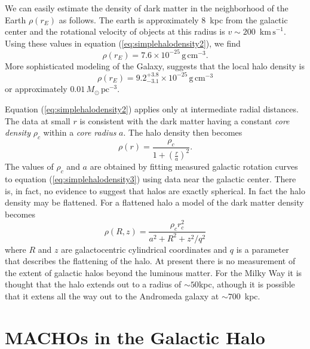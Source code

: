 We can easily estimate the density of dark matter in the neighborhood of the
Earth $\rho(r_E)$ as follows. The earth is approximately $8$~kpc
from the galactic center and the rotational velocity of objects at this radius
is $v\sim 200$~$\mathrm{km\,s}^{-1}$. Using these values in equation
(\ref{eq:simplehalodensity2}), we find
\begin{equation}
\rho(r_E) = 7.6 \times 10^{-25}\, \mathrm{g}\,\mathrm{cm}^{-3}.
\end{equation}
More sophisticated modeling of the
Galaxy\cite{1995ApJ...449L.123G}, suggests that the local halo density is
\begin{equation}
\rho(r_E) = 9.2_{-3.1}^{+3.8} \times 10^{-25}\, \mathrm{g}\,\mathrm{cm}^{-3}
\end{equation}
or approximately $0.01\,M_\odot\,\mathrm{pc}^{-3}$.

Equation (\ref{eq:simplehalodensity2}) applies only at intermediate radial
distances. The data at small $r$ is consistent with the dark matter having a
constant \emph{core density} $\rho_c$ within a \emph{core radius}
$a$\cite{Rix:1996}. The halo density then becomes
\begin{equation}
\rho(r) = \frac{\rho_c}{1 + \left(\frac{r}{a}\right)^2}.
\label{eq:simplehalodensity3}
\end{equation}
The values of $\rho_c$ and $a$ are obtained by fitting measured galactic
rotation curves to equation (\ref{eq:simplehalodensity3}) using data near the
galactic center.  There is, in fact, no evidence to suggest that halos are
exactly spherical. In fact the halo density may be flattened\cite{Rix:1996}. For a
flattened halo a model of the dark matter density becomes
\begin{equation}
\rho(R,z) = \frac{\rho_c r^2_c}{a^2 + R^2 + z^2/q^2}
\label{eq:simplehalodensity4}
\end{equation}
where $R$ and $z$ are galactocentric cylindrical coordinates and $q$ is a
parameter that describes the flattening of the halo. At present there is no
measurement of the extent of galactic halos beyond the luminous matter. For
the Milky Way it is thought that the halo extends out to a radius of $\sim
50$kpc, athough it is possible that it extens all the way out to the Andromeda
galaxy at $\sim 700$~kpc.

\section{MACHOs in the Galactic Halo}
\label{s:machos}

